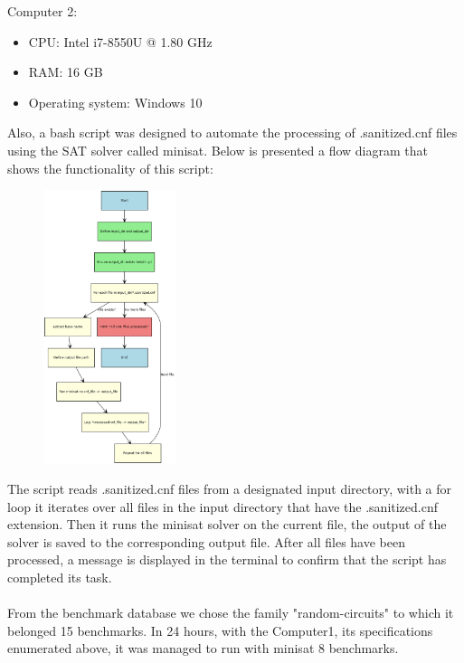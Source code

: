 \documentclass[runningheads]{llncs}
\begin{document}
Computer 2: 
\begin{itemize}
  \item CPU: Intel i7-8550U @ 1.80 GHz
  \item RAM: 16 GB
   \item Operating system: Windows 10
\end{itemize}

Also, a bash script was designed to automate the processing of .sanitized.cnf files using the SAT solver called minisat. Below is presented a flow diagram that shows the functionality of this script: 
\begin{figure}[h] 
    \centering
    \includegraphics[height=8cm]{minisat_flow.png} 
    \label{fig:sample}
\end{figure}

The script reads .sanitized.cnf files from a designated input directory, with a for loop it iterates over all files in the input directory that have the .sanitized.cnf extension. Then it runs the minisat solver on the current file, the output of the solver is saved to the corresponding output file. After all files have been processed, a message is displayed in the terminal to confirm that the script has completed its task.
\\
\\
From the benchmark database we chose the family "random-circuits" to which it belonged 15 benchmarks. In 24 hours, with the Computer1, its specifications enumerated above, it was managed to run with minisat 8 benchmarks. \\
\end{document}
